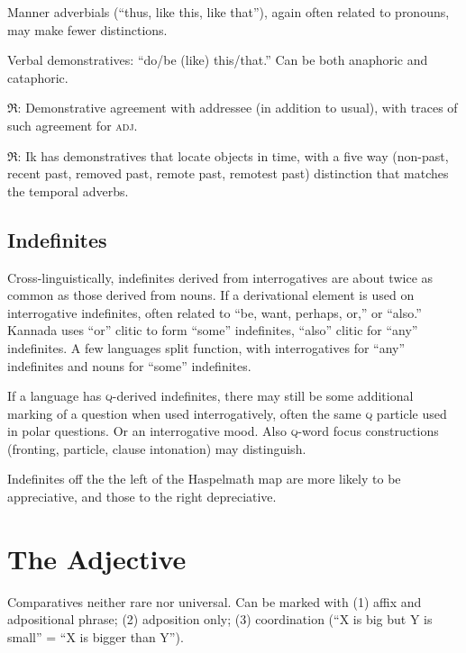 \documentclass[11pt]{article}
\newcommand{\I}[1]{\textsc{#1}}   %
\newcommand{\rara}[1]{$\mathfrak{R}$: #1}
\begin{document}
Manner adverbials (``thus, like this, like that''), again often
related to pronouns, may make fewer distinctions.

Verbal demonstratives: ``do/be (like) this/that.'' Can be both
anaphoric and cataphoric.

\rara{Demonstrative agreement with addressee (in addition to usual),
  with traces of such agreement for \I{adj}.}

\rara{Ik has demonstratives that locate objects in time, with a
five way (non-past, recent past, removed past, remote past, remotest
past) distinction that matches the temporal adverbs.}


\subsection{Indefinites}
Cross-linguistically, indefinites derived from interrogatives are about
twice as common as those derived from nouns. If a derivational element
is used on interrogative indefinites, often related to ``be, want,
perhaps, or,'' or ``also.''  Kannada uses ``or'' clitic to form
``some'' indefinites, ``also'' clitic for ``any'' indefinites.  A few
languages split function, with interrogatives for ``any'' indefinites
and nouns for ``some'' indefinites.

If a language has \I{q}-derived indefinites, there may still be some
additional marking of a question when used interrogatively, often the
same \I{q} particle used in polar questions.  Or an interrogative
mood.  Also \I{q}-word focus constructions (fronting, particle, clause
intonation) may distinguish.

Indefinites off the the left of the Haspelmath map are more likely to
be appreciative, and those to the right depreciative.



\section{The Adjective}
Comparatives neither rare nor universal.  Can be marked with (1) affix
and adpositional phrase; (2) adposition only; (3) coordination (``X is
big but Y is small'' = ``X is bigger than Y'').
\end{document}
